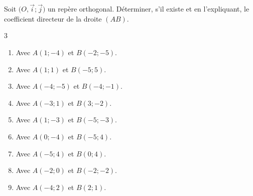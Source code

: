 {%
\begin{Exercice}
Soit $\big(O,\vec i;\vec j\big)$ un repère orthogonal.  Déterminer, s'il existe et en l'expliquant, le coefficient directeur de la droite $(AB)$.
\begin{multicols}{3}
\begin{enumerate}[itemsep=1em]
	\item \begin{minipage}[t]{\linewidth}Avec $A(1;-4)$ et $B(-2;-5)$. \end{minipage}
	\item \begin{minipage}[t]{\linewidth}Avec $A(1;1)$ et $B(-5;5)$. \end{minipage}
	\item \begin{minipage}[t]{\linewidth}Avec $A(-4;-5)$ et $B(-4;-1)$. \end{minipage}
	\item \begin{minipage}[t]{\linewidth}Avec $A(-3;1)$ et $B(3;-2)$. \end{minipage}
	\item \begin{minipage}[t]{\linewidth}Avec $A(1;-3)$ et $B(-5;-3)$. \end{minipage}
	\item \begin{minipage}[t]{\linewidth}Avec $A(0;-4)$ et $B(-5;4)$. \end{minipage}
	\item \begin{minipage}[t]{\linewidth}Avec $A(-5;4)$ et $B(0;4)$. \end{minipage}
	\item \begin{minipage}[t]{\linewidth}Avec $A(-2;0)$ et $B(-2;-2)$. \end{minipage}
	\item \begin{minipage}[t]{\linewidth}Avec $A(-4;2)$ et $B(2;1)$. \end{minipage}
\end{enumerate}
\end{multicols}
\end{Exercice}

}
